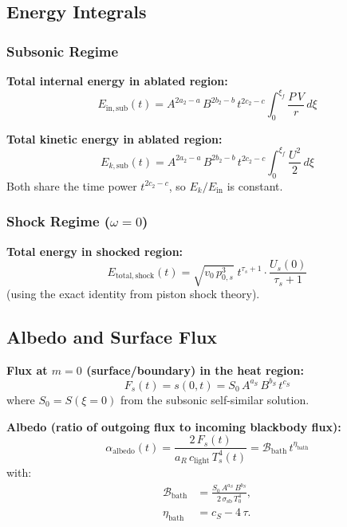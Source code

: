 \documentclass[11pt]{article}
\newcommand{\xsi}{\xi}
\newcommand{\xsif}{\xi_f}
\begin{document}
\subsection{Energy Integrals}

\subsubsection{Subsonic Regime}

\textbf{Total internal energy in ablated region:}
\begin{equation}
  \boxed{E_{\mathrm{in,sub}}(t) = A^{2a_2-a}\,B^{2b_2-b}\,t^{2c_2-c}\int_0^{\xsif}\frac{P\,V}{r}\,d\xsi}
\end{equation}

\textbf{Total kinetic energy in ablated region:}
\begin{equation}
  \boxed{E_{k,\mathrm{sub}}(t) = A^{2a_2-a}\,B^{2b_2-b}\,t^{2c_2-c}\int_0^{\xsif}\frac{U^2}{2}\,d\xsi}
\end{equation}
Both share the time power $t^{2c_2-c}$, so $E_k/E_{\mathrm{in}}$ is constant.

\subsubsection{Shock Regime ($\omega=0$)}

\textbf{Total energy in shocked region:}
\begin{equation}
  \boxed{E_{\mathrm{total,shock}}(t) = \sqrt{v_0\,p_{0,s}^{3}}\;t^{\tau_s+1}\cdot\frac{U_s(0)}{\tau_s+1}}
\end{equation}
(using the exact identity from piston shock theory).

\subsection{Albedo and Surface Flux}

\textbf{Flux at $m=0$ (surface/boundary) in the heat region:}
\begin{equation}
  \boxed{F_s(t) = s(0,t) = S_0\,A^{a_S}\,B^{b_S}\,t^{c_S}}
\end{equation}
where $S_0 = S(\xsi=0)$ from the subsonic self-similar solution.

\textbf{Albedo (ratio of outgoing flux to incoming blackbody flux):}
\begin{equation}
  \boxed{\alpha_{\mathrm{albedo}}(t) = \frac{2\,F_s(t)}{a_R\,c_{\mathrm{light}}\,T_s^4(t)}
  = \mathcal{B}_{\mathrm{bath}}\,t^{\eta_{\mathrm{bath}}}}
\end{equation}
with:
\begin{align}
  \mathcal{B}_{\mathrm{bath}} &= \frac{S_0\,A^{a_S}\,B^{b_S}}{2\,\sigma_{\mathrm{sb}}\,T_0^4}, \\
  \eta_{\mathrm{bath}} &= c_S - 4\,\tau.
\end{align}
\end{document}
